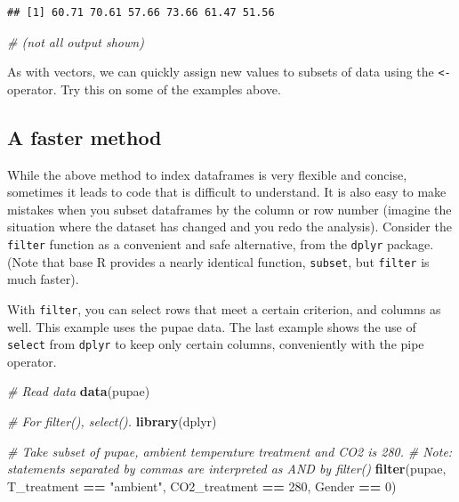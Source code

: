 \documentclass[]{book}
\newenvironment{Shaded}{\begin{snugshade}}{\end{snugshade}}
\newcommand{\CommentTok}[1]{\textcolor[rgb]{0.56,0.35,0.01}{\textit{#1}}}
\newcommand{\DecValTok}[1]{\textcolor[rgb]{0.00,0.00,0.81}{#1}}
\newcommand{\KeywordTok}[1]{\textcolor[rgb]{0.13,0.29,0.53}{\textbf{#1}}}
\newcommand{\NormalTok}[1]{#1}
\newcommand{\OperatorTok}[1]{\textcolor[rgb]{0.81,0.36,0.00}{\textbf{#1}}}
\newcommand{\StringTok}[1]{\textcolor[rgb]{0.31,0.60,0.02}{#1}}
\let\BeginKnitrBlock\begin \let\EndKnitrBlock\end
\begin{document}
\begin{verbatim}
## [1] 60.71 70.61 57.66 73.66 61.47 51.56
\end{verbatim}

\begin{Shaded}
\begin{Highlighting}[]
\CommentTok{# (not all output shown)}
\end{Highlighting}
\end{Shaded}

\BeginKnitrBlock{rmdtry}
As with vectors, we can quickly assign new values to subsets of data using the \texttt{\textless{}-} operator. Try this on some of the examples above.
\EndKnitrBlock{rmdtry}

\hypertarget{a-faster-method}{%
\subsection{A faster method}\label{a-faster-method}}

While the above method to index dataframes is very flexible and concise, sometimes it leads to code that is difficult to understand. It is also easy to make mistakes when you subset dataframes by the column or row number (imagine the situation where the dataset has changed and you redo the analysis). Consider the \texttt{filter} function as a convenient and safe alternative, from the \texttt{dplyr} package. (Note that base R provides a nearly identical function, \texttt{subset}, but \texttt{filter} is much faster).

With \texttt{filter}, you can select rows that meet a certain criterion, and columns as well. This example uses the pupae data. The last example shows the use of \texttt{select} from \texttt{dplyr} to keep only certain columns, conveniently with the pipe operator.

\begin{Shaded}
\begin{Highlighting}[]
\CommentTok{# Read data}
\KeywordTok{data}\NormalTok{(pupae)}

\CommentTok{# For filter(), select().}
\KeywordTok{library}\NormalTok{(dplyr)}

\CommentTok{# Take subset of pupae, ambient temperature treatment and CO2 is 280.}
\CommentTok{# Note: statements separated by commas are interpreted as AND by filter()}
\KeywordTok{filter}\NormalTok{(pupae, }
\NormalTok{       T_treatment }\OperatorTok{==}\StringTok{ "ambient"}\NormalTok{,}
\NormalTok{       CO2_treatment }\OperatorTok{==}\StringTok{ }\DecValTok{280}\NormalTok{,}
\NormalTok{       Gender }\OperatorTok{==}\StringTok{ }\DecValTok{0}\NormalTok{)}
\end{Highlighting}
\end{Shaded}
\end{document}
